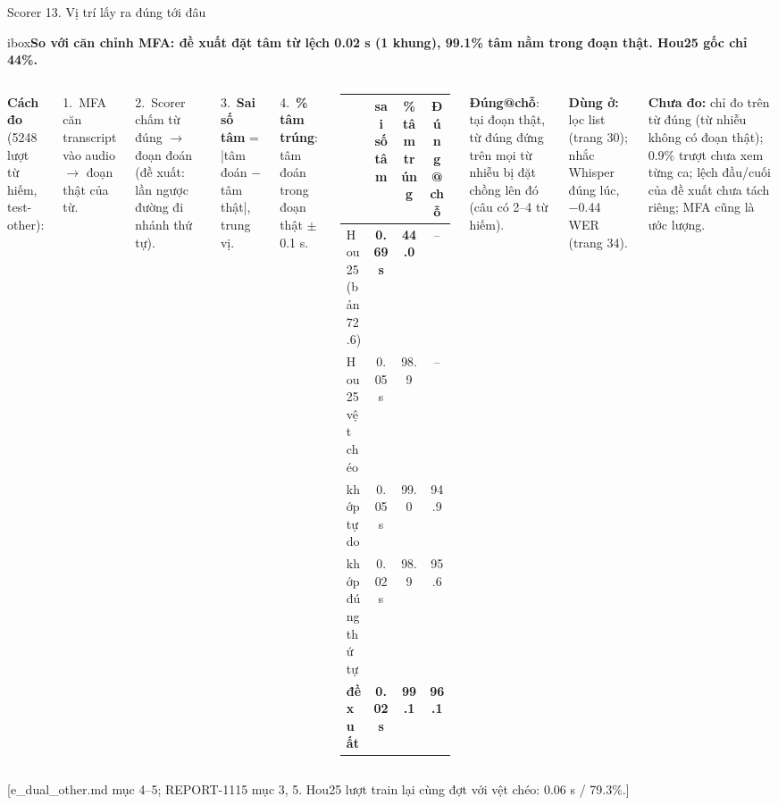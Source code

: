 \documentclass[aspectratio=169,xcolor=table]{beamer}
\newcommand{\bad}[1]{\textcolor{RiskRed}{\textbf{#1}}}
\newcommand{\good}[1]{\textcolor{GoodGreen}{\textbf{#1}}}
\newcommand{\src}[1]{\par\vfill{\tiny\color{TextGray}[#1]}}
\newcommand{\ra}{$\rightarrow$}
\newcommand{\nb}[1]{\textcolor{Accent}{#1}}
\newcommand{\insight}[1]{\begin{beamercolorbox}[sep=0.55em,rounded=true]{ibox}\small\bfseries #1\end{beamercolorbox}\vspace{0.15cm}}
\begin{document}
\begin{frame}{Scorer 13. Vị trí lấy ra đúng tới đâu}
\insight{So với căn chỉnh MFA: đề xuất đặt tâm từ lệch \nb{0.02 s} (1 khung), \nb{99.1\%} tâm nằm trong đoạn thật. Hou25 gốc chỉ \nb{44\%}.}
\begin{columns}[T]
\centering
\raggedright
{\scriptsize\textbf{Cách đo} (5248 lượt từ hiếm, test-other):\par
1.\ MFA căn transcript vào audio \ra{} đoạn thật của từ.\par
2.\ Scorer chấm từ đúng \ra{} đoạn đoán (đề xuất: lần ngược đường đi nhánh thứ tự).\par
3.\ \textbf{Sai số tâm} = |tâm đoán $-$ tâm thật|, trung vị.\par
4.\ \textbf{\% tâm trúng}: tâm đoán trong đoạn thật $\pm$0.1 s.\par}
\renewcommand{\arraystretch}{1.1}\scriptsize\setlength{\tabcolsep}{4pt}
\begin{tabular}{lccc}
\toprule
& sai số tâm & \% tâm trúng & Đúng@chỗ \\
\midrule
Hou25 (bản 72.6) & \bad{0.69 s} & \bad{44.0} & -- \\
Hou25 vệt chéo & 0.05 s & 98.9 & -- \\
khớp tự do & 0.05 s & 99.0 & 94.9 \\
khớp đúng thứ tự & 0.02 s & 98.9 & 95.6 \\
\rowcolor{Accent!15}\textbf{đề xuất} & \good{0.02 s} & \good{99.1} & \good{96.1} \\
\bottomrule
\end{tabular}
\par\vspace{0.06cm}
{\tiny \textbf{Đúng@chỗ}: tại đoạn thật, từ đúng đứng trên mọi từ nhiễu bị đặt chồng lên đó (câu có 2--4 từ hiếm).\par\vspace{0.08cm}}
{\scriptsize\textbf{Dùng ở:} lọc list (trang 30); nhắc Whisper đúng lúc, $-$0.44 WER (trang 34).\par\vspace{0.06cm}}
{\tiny\color{RiskRed}\textbf{Chưa đo:} chỉ đo trên từ đúng (từ nhiễu không có đoạn thật); 0.9\% trượt chưa xem từng ca; lệch đầu/cuối của đề xuất chưa tách riêng; MFA cũng là ước lượng.\par}
\end{columns}
\src{e\_dual\_other.md mục 4--5; REPORT-1115 mục 3, 5. Hou25 lượt train lại cùng đợt với vệt chéo: 0.06 s / 79.3\%.}
\end{frame}
\end{document}
